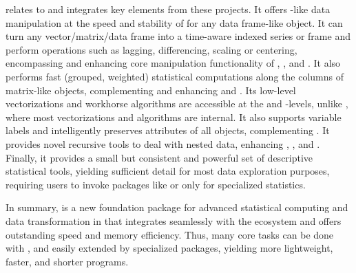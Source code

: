 \documentclass[nojss]{jss} %
\begin{document}
 relates to and integrates key elements from these projects. It offers -like data manipulation at the speed and stability of  for any data frame-like object. It can turn any vector/matrix/data frame into a time-aware indexed series or frame and perform operations such as lagging, differencing, scaling or centering, encompassing and enhancing core manipulation functionality of , , and . It also performs fast (grouped, weighted) statistical computations along the columns of matrix-like objects, complementing and enhancing  and . Its low-level vectorizations and workhorse algorithms are accessible at the  and -levels, unlike , where most vectorizations and algorithms are internal. It also supports variable labels and intelligently preserves attributes of all objects, complementing . It provides novel recursive tools to deal with nested data, enhancing , , and . Finally, it provides a small but consistent and powerful set of descriptive statistical tools, yielding sufficient detail for most data exploration purposes, requiring users to invoke packages like  or  only for specialized statistics. \newline

In summary,  is a new foundation package for advanced statistical computing and data transformation in  that integrates seamlessly with the ecosystem and offers outstanding speed and memory efficiency. Thus, many core tasks can be done with , and easily extended by specialized packages, yielding more lightweight, faster, and shorter  programs. \newline
\end{document}
